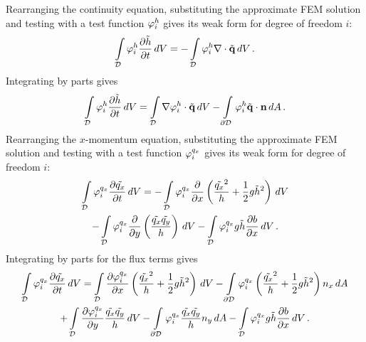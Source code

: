 Rearranging the continuity equation, substituting the approximate FEM
solution and testing with a test function $\varphi_i^h$ gives its
weak form for degree of freedom $i$:
\begin{equation}
  \int\limits_{\mathcal{D}} \varphi_i^h\frac{\partial \tilde{h}}{\partial t} \,dV
  = - \int\limits_{\mathcal{D}} \varphi_i^h\nabla\cdot\tilde{\mathbf{q}} \,dV
  \,.
\end{equation}
Integrating by parts gives
\begin{equation}
  \int\limits_{\mathcal{D}} \varphi_i^h\frac{\partial \tilde{h}}{\partial t} \,dV
  = \int\limits_{\mathcal{D}} \nabla\varphi_i^h\cdot\tilde{\mathbf{q}} \,dV
  - \int\limits_{\partial\mathcal{D}} \varphi_i^h\tilde{\mathbf{q}}\cdot\mathbf{n} \,dA
  \,.
\end{equation}
Rearranging the $x$-momentum equation, substituting the approximate FEM solution
and testing with a test function $\varphi_i^{q_x}$
gives its weak form for degree of freedom $i$:
\begin{multline}
  \int\limits_{\mathcal{D}} \varphi_i^{q_x}\frac{\partial \tilde{q_x}}{\partial t} \,dV
  =
  - \int\limits_{\mathcal{D}} \varphi_i^{q_x}
      \frac{\partial }{\partial x}\left(\frac{\tilde{q_x}^2}{h}
      + \frac{1}{2}g\tilde{h}^2\right) \,dV
  \\
  - \int\limits_{\mathcal{D}} \varphi_i^{q_x}
      \frac{\partial }{\partial y}\left(\frac{\tilde{q_x}\tilde{q_y}}
        {h}\right) \,dV
  - \int\limits_{\mathcal{D}} \varphi_i^{q_x}
      g\tilde{h}\frac{\partial b}{\partial x} \,dV
  \,.
\end{multline}
Integrating by parts for the flux terms gives
\begin{multline}
  \int\limits_{\mathcal{D}} \varphi_i^{q_x}\frac{\partial \tilde{q_x}}{\partial t} \,dV
  =
    \int\limits_{\mathcal{D}} \frac{\partial \varphi_i^{q_x}}{\partial x}
      \left(\frac{\tilde{q_x}^2}{h}
      + \frac{1}{2}g\tilde{h}^2\right) \,dV
  - \int\limits_{\partial\mathcal{D}} \varphi_i^{q_x}
      \left(\frac{\tilde{q_x}^2}{h}
      + \frac{1}{2}g\tilde{h}^2\right)n_x \,dA
  \\
  + \int\limits_{\mathcal{D}} \frac{\partial \varphi_i^{q_x}}{\partial y}
      \frac{\tilde{q_x}\tilde{q_y}}
        {h} \,dV
  - \int\limits_{\partial\mathcal{D}} \varphi_i^{q_x}
      \frac{\tilde{q_x}\tilde{q_y}}
        {h}n_y \,dA
  - \int\limits_{\mathcal{D}} \varphi_i^{q_x}
      g\tilde{h}\frac{\partial b}{\partial x} \,dV
  \,.
\end{multline}
